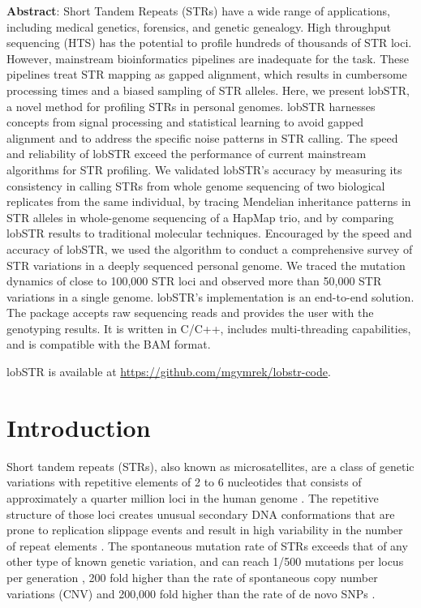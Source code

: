 \textbf{Abstract}: Short Tandem Repeats (STRs) have a wide range of applications, including medical genetics, forensics, and genetic genealogy. High throughput sequencing (HTS) has the potential to profile hundreds of thousands of STR loci. However, mainstream bioinformatics pipelines are inadequate for the task. These pipelines treat STR mapping as gapped alignment, which results in cumbersome processing times and a biased sampling of STR alleles. Here, we present lobSTR, a novel method for profiling STRs in personal genomes. lobSTR harnesses concepts from signal processing and statistical learning to avoid gapped alignment and to address the specific noise patterns in STR calling. The speed and reliability of lobSTR exceed the performance of current mainstream algorithms for STR profiling. We validated lobSTR’s accuracy by measuring its consistency in calling STRs from whole genome sequencing of two biological replicates from the same individual, by tracing Mendelian inheritance patterns in STR alleles in whole-genome sequencing of a HapMap trio, and by comparing lobSTR results to traditional molecular techniques. Encouraged by the speed and accuracy of lobSTR, we used the algorithm to conduct a comprehensive survey of STR variations in a deeply sequenced personal genome. We traced the mutation dynamics of close to 100,000 STR loci and observed more than 50,000 STR variations in a single genome. lobSTR’s implementation is an end-to-end solution. The package accepts raw sequencing reads and provides the user with the genotyping results. It is written in C/C++, includes multi-threading capabilities, and is compatible with the BAM format.

lobSTR is available at \url{https://github.com/mgymrek/lobstr-code}.

\section{Introduction}
Short tandem repeats (STRs), also known as microsatellites, are a class of genetic variations with repetitive elements of 2 to 6 nucleotides that consists of approximately a quarter million loci in the human genome \cite{Benson1999}. The repetitive structure of those loci creates unusual secondary DNA conformations that are prone to replication slippage events and result in high variability in the number of repeat elements \cite{Mirkin2007}. The spontaneous mutation rate of STRs exceeds that of any other type of known genetic variation, and can reach 1/500 mutations per locus per generation \cite{Walsh2001,BallantyneGoedbloedFangEtAl2010}, 200 fold higher than the rate of spontaneous copy number variations (CNV) \cite{Lupski2007} and 200,000 fold higher than the rate of de novo SNPs \cite{ConradKeeblerDePristoEtAl2011}.

